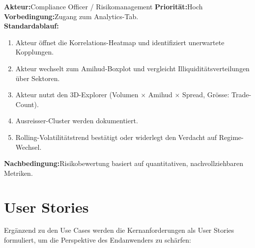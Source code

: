 \documentclass[11pt, a4paper, oneside, openany]{report}
\begin{document}
\vspace{8pt}

\begin{reqbox}
\textbf{Akteur:}\;Compliance Officer / Risikomanagement \qquad \textbf{Priorität:}\;Hoch \\[4pt]
\textbf{Vorbedingung:}\;Zugang zum Analytics-Tab. \\[4pt]
\textbf{Standardablauf:}
\begin{enumerate}[leftmargin=2em]
  \item Akteur öffnet die Korrelations-Heatmap und identifiziert unerwartete Kopplungen.
  \item Akteur wechselt zum Amihud-Boxplot und vergleicht Illiquiditätsverteilungen über Sektoren.
  \item Akteur nutzt den 3D-Explorer (Volumen $\times$ Amihud $\times$ Spread, Grösse: Trade-Count).
  \item Ausreisser-Cluster werden dokumentiert.
  \item Rolling-Volatilitätstrend bestätigt oder widerlegt den Verdacht auf Regime-Wechsel.
\end{enumerate}
\textbf{Nachbedingung:}\;Risikobewertung basiert auf quantitativen, nachvollziehbaren Metriken.
\end{reqbox}

\section{User Stories}
\label{sec:userstories}

Ergänzend zu den Use Cases werden die Kernanforderungen als User Stories formuliert, um die Perspektive des Endanwenders zu schärfen:
\end{document}
